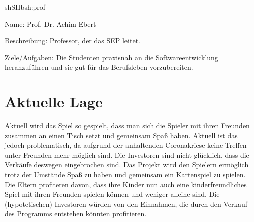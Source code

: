 \begin{description}[leftmargin=5em, style=sameline]
	\begin{lhp}{sh}{SH}{bsh:prof}
		\item [Name:] Prof. Dr. Achim Ebert
		\item [Beschreibung:] Professor, der das SEP leitet.
		\item [Ziele/Aufgaben:] Die Studenten praxisnah an die Softwareentwicklung heranzuführen
		                        und sie gut für das Berufsleben vorzubereiten.
	\end{lhp}
		
\end{description}

\section{Aktuelle Lage}

Aktuell wird das Spiel so gespielt, dass man sich die Spieler mit ihren Freunden zusammen an einen Tisch
setzt und gemeinsam Spaß haben. Aktuell ist das jedoch problematisch, da aufgrund der anhaltenden Coronakriese keine
Treffen unter Freunden mehr möglich sind. Die Investoren sind nicht glücklich, dass die Verkäufe
deswegen eingebrochen sind. Das Projekt wird den Spielern ermöglich trotz der Umstände Spaß zu haben
und gemeinsam ein Kartenspiel zu spielen. Die Eltern profiteren davon, dass ihre Kinder nun auch
eine kinderfreundliches Spiel mit ihren Freunden spielen können und weniger alleine sind.
Die (hypotetischen) Investoren würden von den Einnahmen, die durch den Verkauf des Programms entstehen könnten
profitieren.